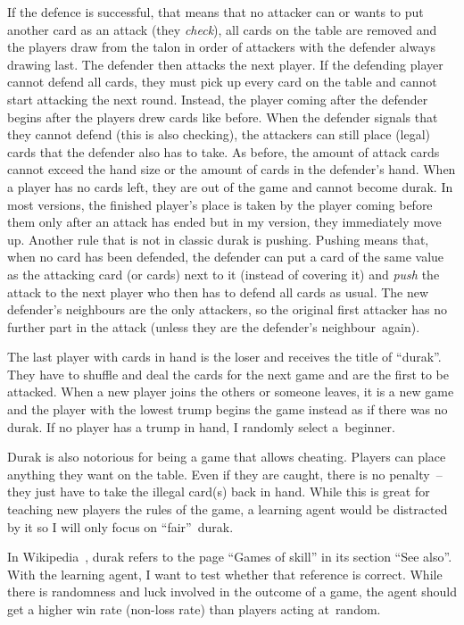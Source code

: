 \documentclass[a4paper,titlepage]{article}
\begin{document}
If the defence is successful, that means that no attacker can or wants to put another card as an attack (they \emph{check}), all cards on the table are removed and the players draw from the talon in order of attackers with the defender always drawing last. The defender then attacks the next player.
If the defending player cannot defend all cards, they must pick up every card on the table and cannot start attacking the next round. Instead, the player coming after the defender begins after the players drew cards like before. When the defender signals that they cannot defend (this is also checking), the attackers can still place (legal) cards that the defender also has to take. As before, the amount of attack cards cannot exceed the hand size or the amount of cards in the defender's hand.
When a player has no cards left, they are out of the game and cannot become durak. In most versions, the finished player's place is taken by the player coming before them only after an attack has ended but in my version, they immediately move up.
Another rule that is not in classic durak is pushing. Pushing means that, when no card has been defended, the defender can put a card of the same value as the attacking card (or cards) next to it (instead of covering it) and \emph{push} the attack to the next player who then has to defend all cards as usual. The new defender's neighbours are the only attackers, so the original first attacker has no further part in the attack (unless they are the defender's neighbour~again).

The last player with cards in hand is the loser and receives the title of ``durak''. They have to shuffle and deal the cards for the next game and are the first to be attacked. When a new player joins the others or someone leaves, it is a new game and the player with the lowest trump begins the game instead as if there was no durak. If no player has a trump in hand, I randomly select a~beginner. \medskip

Durak is also notorious for being a game that allows cheating. Players can place anything they want on the table. Even if they are caught, there is no penalty~-- they just have to take the illegal card(s) back in hand. While this is great for teaching new players the rules of the game, a learning agent would be distracted by it so I will only focus on ``fair''~durak.

In Wikipedia~\cite{wikidurak}, durak refers to the page ``Games of skill'' in its section ``See also''. With the learning agent, I want to test whether that reference is correct. While there is randomness and luck involved in the outcome of a game, the agent should get a higher win rate (non-loss rate) than players acting at~random. \medskip
\end{document}
